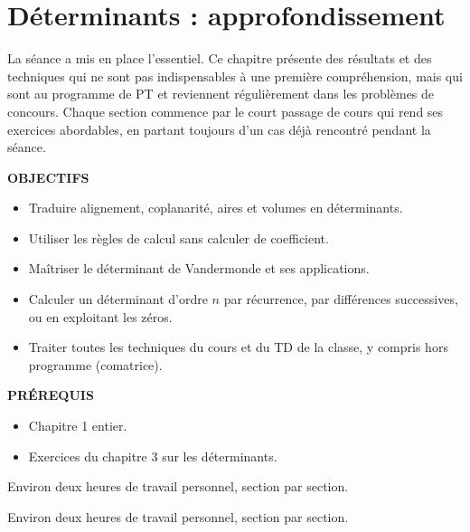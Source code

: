 \documentclass[a4paper,11pt]{article}
\numberwithin{equation}{section}
\numberwithin{figure}{section}
\numberwithin{table}{section}
\theoremstyle{enonce}
\theoremstyle{exemple}
\theoremstyle{remarque}
\newcommand{\ouverture}[3]{%
  \begin{tcolorbox}[enhanced,colback=Fond,colframe=Fond,arc=0pt,boxrule=0pt,left=12pt,right=12pt,top=10pt,bottom=10pt,
     before skip=1.2em,after skip=1.6em]
  \begin{minipage}[t]{0.56\linewidth}
  {\sffamily\bfseries\small\color{Bleu}OBJECTIFS}\par\vspace{0.3em}\small #1
  \end{minipage}\hfill
  \begin{minipage}[t]{0.38\linewidth}
  {\sffamily\bfseries\small\color{Bleu}PRÉREQUIS}\par\vspace{0.3em}\small #2
  \ifx\relax#3\relax\else\par\vspace{0.6em}{\sffamily\bfseries\small\color{Bleu}DURÉE}\par\vspace{0.2em}\small #3\fi
  \end{minipage}
  \end{tcolorbox}}
\begin{document}
\clearpage
\section{Déterminants : approfondissement}\label{sec:approf}

La séance a mis en place l'essentiel. Ce chapitre présente des résultats et des techniques qui ne sont pas
indispensables à une première compréhension, mais qui sont au programme de PT et reviennent régulièrement dans les
problèmes de concours. Chaque section commence par le court passage de cours qui rend ses exercices abordables, en
partant toujours d'un cas déjà rencontré pendant la séance.

\ouverture{%
\begin{itemize}
\item Traduire alignement, coplanarité, aires et volumes en déterminants.
\item Utiliser les règles de calcul sans calculer de coefficient.
\item Maîtriser le déterminant de Vandermonde et ses applications.
\item Calculer un déterminant d'ordre $n$ par récurrence, par différences successives, ou en exploitant les zéros.
\item Traiter toutes les techniques du cours et du TD de la classe, y compris hors programme (comatrice).
\end{itemize}}{%
\begin{itemize}
\item Chapitre 1 entier.
\item Exercices du chapitre 3 sur les déterminants.
\end{itemize}}{Environ deux heures de travail personnel, section par section.}
\end{document}
